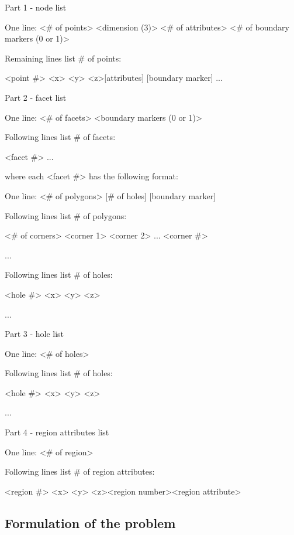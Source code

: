 Part 1 - node list

    One line: <\# of points> <dimension (3)> <\# of attributes> <\# of boundary markers (0 or 1)>
    
    Remaining lines list \# of points:
    
    <point \#> <x> <y> <z>[attributes] [boundary marker]
    ... 

Part 2 - facet list

    One line: <\# of facets> <boundary markers (0 or 1)>
    
    Following lines list \# of facets:
    
    <facet \#>
    ... 

where each <facet \#> has the following format:

    One line: <\# of polygons> [\# of holes] [boundary marker]
    
    Following lines list \# of polygons:
    
    <\# of corners> <corner 1> <corner 2> ... <corner \#>
    
    ...
    
    Following lines list \# of holes:
    
    <hole \#> <x> <y> <z>
    
    ... 

Part 3 - hole list

    One line: <\# of holes>
    
    Following lines list \# of holes:
    
    <hole \#> <x> <y> <z>
    
    ... 

Part 4 - region attributes list

    One line: <\# of region>
    
    Following lines list \# of region attributes:
    
    <region \#> <x> <y> <z><region number><region attribute>

\subsection{Formulation of the problem}

